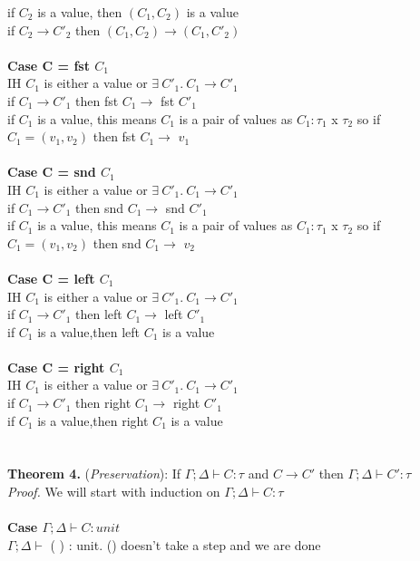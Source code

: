 \documentclass{article}
\begin{document}
if $C_2$ is a value, then $(C_1,C_2)$ is a value \\
if $C_2 \to C'_2$ then $(C_1,C_2) \to (C_1,C'_2)$ \\ \\
\textbf{Case C = fst $C_1$} \\
IH $C_1$ is either a value or $  \exists \ C'_1.\ C_1 \to C'_1 $ \\
if $C_1 \to C'_1$ then fst $C_1 \to$ fst $C'_1$\\
if $C_1$ is a value, this means $C_1$ is a pair of values as $C_1: \tau_1$ x $\tau_2$
 so if $C_1 = (v_1, v_2)$ then fst $C_1 \to$ $v_1$\\ \\
\textbf{Case C = snd $C_1$} \\
IH $C_1$ is either a value or $  \exists \ C'_1.\ C_1 \to C'_1 $ \\
if $C_1 \to C'_1$ then snd $C_1 \to$ snd $C'_1$\\
if $C_1$ is a value, this means $C_1$ is a pair of values as $C_1: \tau_1$ x $\tau_2$
 so if $C_1 = (v_1, v_2)$ then snd $C_1 \to$ $v_2$\\ \\
\textbf{Case C = left $C_1$} \\
IH $C_1$ is either a value or $  \exists \ C'_1.\ C_1 \to C'_1 $ \\
if $C_1 \to C'_1$ then left $C_1 \to$ left $C'_1$\\
if $C_1$ is a value,then left $C_1$ is a value\\ \\
\textbf{Case C = right $C_1$} \\
IH $C_1$ is either a value or $  \exists \ C'_1.\ C_1 \to C'_1 $ \\
if $C_1 \to C'_1$ then right $C_1 \to$ right $C'_1$\\
if $C_1$ is a value,then right $C_1$ is a value\\ \\
\\
\textbf{Theorem 4.} (\textit{Preservation}): If $\Gamma;\Delta \vdash C : \tau$ and  $C \to C'$ then $\Gamma;\Delta \vdash C' : \tau$
  \\
\textit{Proof.} We will start with induction on $\Gamma;\Delta \vdash C : \tau$ \\ \\
\textbf{Case $\Gamma; \Delta \vdash C : unit$} \\
 $\Gamma; \Delta \vdash $ ( ) : unit. () doesn't take a step and we are done \\ \\
\end{document}
